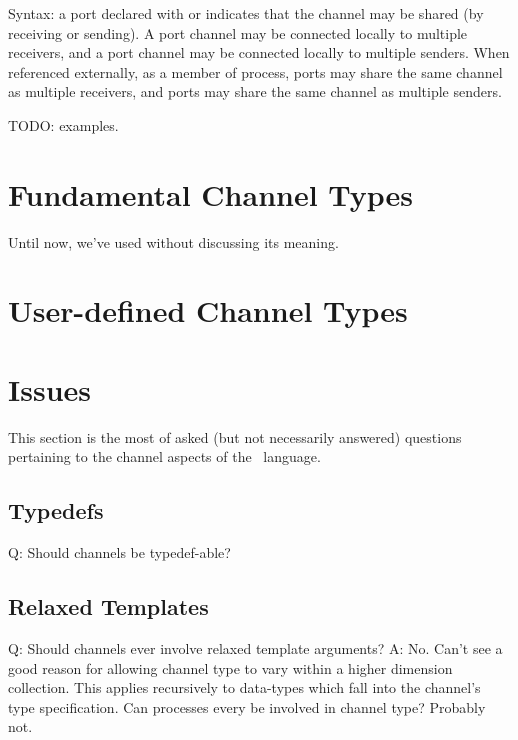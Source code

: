 Syntax: a port declared with  or \ttt{!!} indicates that
the channel may be shared (by receiving or sending).  
A  port channel may be connected locally to multiple receivers, 
and a \ttt{!!} port channel may be connected locally to multiple senders.  
When referenced externally, as a member of process, 
 ports may share the same channel as multiple receivers, and 
\ttt{!!} ports may share the same channel as multiple senders.  

TODO: examples.  

\section{Fundamental Channel Types}
\label{sec:channels:fundamental}

Until now, we've used  without discussing its meaning.  


\section{User-defined Channel Types}
\label{sec:channels:userdef}

\section{Issues}
\label{sec:channels:issues}

This section is the most of asked (but not necessarily answered) questions
pertaining to the channel aspects of the \hac\ language.  

\subsection{Typedefs}
\label{sec:channels:typedefs}

Q: Should channels be typedef-able?

\subsection{Relaxed Templates}
\label{sec:channels:relaxed_templates}

Q: Should channels ever involve relaxed template arguments?
A: No.  Can't see a good reason for allowing channel type to vary
	within a higher dimension collection.  This applies recursively
	to data-types which fall into the channel's type specification.  
	Can processes every be involved in channel type?  Probably not.  

